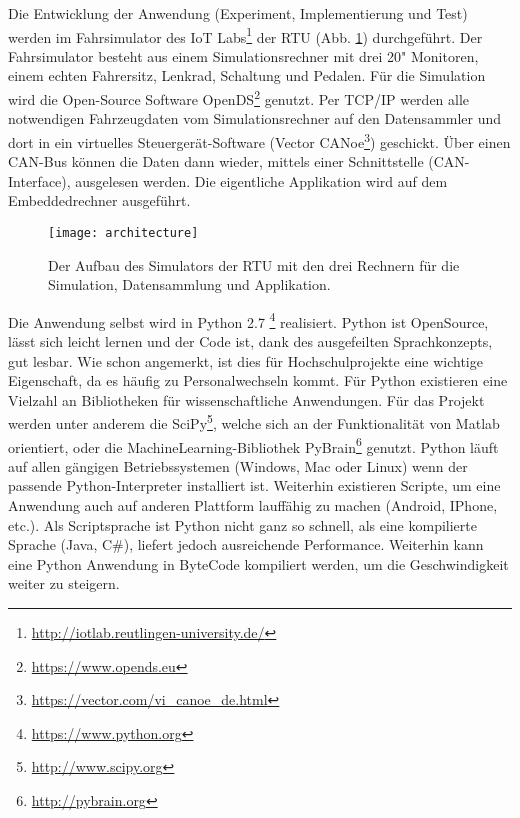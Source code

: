 \label{chap:infrastructure}
Die Entwicklung der Anwendung (Experiment, Implementierung und Test) werden im Fahrsimulator des IoT Labs\footnote{\url{http://iotlab.reutlingen-university.de/}} der \acl{RTU} (Abb. \ref{fig:architecure}) durchgeführt. 
Der Fahrsimulator besteht aus einem Simulationsrechner mit drei 20" Monitoren, einem echten Fahrersitz, Lenkrad, Schaltung und Pedalen. Für die Simulation wird die Open-Source Software OpenDS\footnote{\url{https://www.opends.eu}} genutzt. Per TCP/IP werden alle notwendigen Fahrzeugdaten vom Simulationsrechner auf den Datensammler und dort in ein virtuelles Steuergerät-Software (Vector CANoe\footnote{\url{https://vector.com/vi_canoe_de.html}}) geschickt. Über einen CAN-Bus können die Daten dann wieder, mittels einer Schnittstelle (CAN-Interface), ausgelesen werden. Die eigentliche Applikation wird auf dem Embeddedrechner ausgeführt.

\begin{figure}[h] 
  \begin{center}
    \texttt{[image: architecture]}
    \caption[Aufbau des Simulators]{Der Aufbau des Simulators der \acl{RTU} mit den drei Rechnern für die Simulation, Datensammlung und Applikation. \label{fig:architecure}}
  \end{center}
\end{figure}

Die Anwendung selbst wird in Python 2.7 \footnote{\url{https://www.python.org}} realisiert. Python ist OpenSource, lässt sich leicht lernen und der Code ist, dank des ausgefeilten Sprachkonzepts, gut lesbar. Wie schon angemerkt, ist dies für Hochschulprojekte eine wichtige Eigenschaft, da es häufig zu Personalwechseln kommt. Für Python existieren eine Vielzahl an Bibliotheken für wissenschaftliche Anwendungen. Für das Projekt werden unter anderem die SciPy\footnote{\url{http://www.scipy.org}}, welche sich an der Funktionalität von Matlab orientiert, oder die MachineLearning-Bibliothek PyBrain\footnote{\url{http://pybrain.org}} genutzt. Python läuft auf allen gängigen Betriebssystemen (Windows, Mac oder Linux) wenn der passende Python-Interpreter installiert ist. Weiterhin existieren Scripte, um eine Anwendung auch auf anderen Plattform lauffähig zu machen (Android, IPhone, etc.). Als Scriptsprache ist Python nicht ganz so schnell, als eine kompilierte Sprache (Java, C\#), liefert jedoch ausreichende Performance. Weiterhin kann eine Python Anwendung in ByteCode kompiliert werden, um die Geschwindigkeit weiter zu steigern. 

